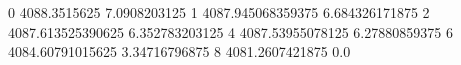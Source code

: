 0 4088.3515625 7.0908203125
1 4087.945068359375 6.684326171875
2 4087.613525390625 6.352783203125
4 4087.53955078125 6.27880859375
6 4084.60791015625 3.34716796875
8 4081.2607421875 0.0
